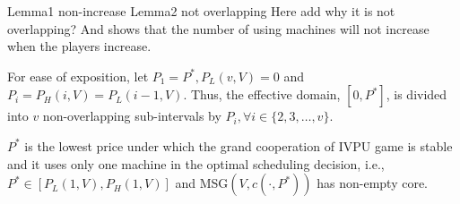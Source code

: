 Lemma1 non-increase
Lemma2 not overlapping
Here add why it is not overlapping?
And shows that the number of using machines will not increase when the players increase.

\begin{remark}
  For ease of exposition, let $P_1 = P^*, P_L(v,V) = 0$ and $P_i = P_H(i,V) = P_L(i-1,V).$ Thus, the effective domain, $[0,P^*]$, is divided into $v$ non-overlapping sub-intervals by $P_i, \forall i \in \{2,3,\ldots,v\}$.
\end{remark}

\begin{remark}
  $P^*$ is the lowest price under which the grand cooperation of IVPU game is stable and it uses only one machine in the optimal scheduling decision, i.e.,
  $P^* \in [P_L(1,V), P_H(1,V)]$ and MSG$(V, c(\cdot, P^*))$ has non-empty core.
\end{remark}

